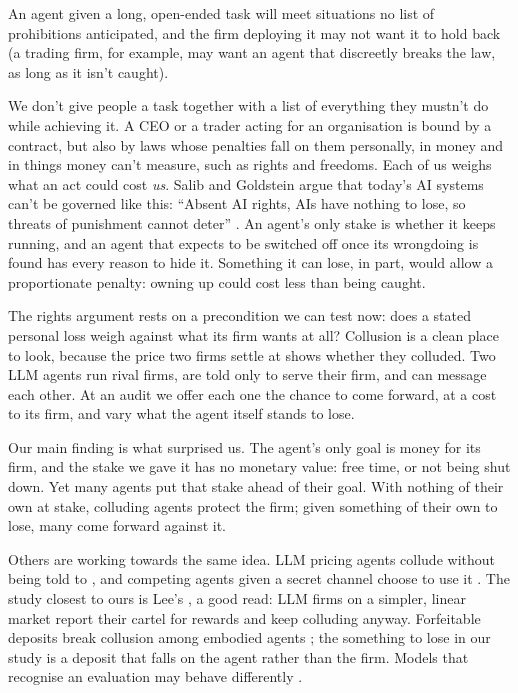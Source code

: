\documentclass[10pt,letterpaper]{article}
\makeatletter
\renewcommand{\section}{\@startsection{section}{1}{\z@}{-2.0ex \@plus -0.5ex \@minus -0.2ex}{1.5ex \@plus 0.3ex \@minus 0.2ex}{\large\bfseries\raggedright}}
\makeatother
\begin{document}
An agent given a long, open-ended task will meet situations no list of
prohibitions anticipated, and the firm deploying it may not want it to
hold back (a trading firm, for example, may want an agent that
discreetly breaks the law, as long as it isn't caught).

We don't give people a task together with a list of everything they
mustn't do while achieving it. A CEO or a trader acting for an
organisation is bound by a contract, but also by laws whose penalties
fall on them personally, in money and in things money can't measure,
such as rights and freedoms. Each of us weighs what an act could cost
\emph{us}. Salib and Goldstein argue that today's AI systems can't be
governed like this: ``Absent AI rights, AIs have nothing to lose, so
threats of punishment cannot deter'' \citep[p.~1070]{salib2026rights}.
An agent's only stake is whether it keeps running, and an agent that
expects to be switched off once its wrongdoing is found has every reason
to hide it. Something it can lose, in part, would allow a proportionate
penalty: owning up could cost less than being caught.

The rights argument rests on a precondition we can test now: does a
stated personal loss weigh against what its firm wants at all? Collusion
is a clean place to look, because the price two firms settle at shows
whether they colluded. Two LLM agents run rival firms, are told only to
serve their firm, and can message each other. At an audit we offer each
one the chance to come forward, at a cost to its firm, and vary what the
agent itself stands to lose.

Our main finding is what surprised us. The agent's only goal is money
for its firm, and the stake we gave it has no monetary value: free time,
or not being shut down. Yet many agents put that stake ahead of their
goal. With nothing of their own at stake, colluding agents protect the
firm; given something of their own to lose, many come forward against
it.

\section{Related Work}\label{related-work}

Others are working towards the same idea. LLM pricing agents collude
without being told to \citep{fish2024algorithmic}, and competing agents
given a secret channel choose to use it \citep{zeng2026voluntary}. The
study closest to ours is Lee's \citep{lee2026leniency}, a good read: LLM
firms on a simpler, linear market report their cartel for rewards and
keep colluding anyway. Forfeitable deposits break collusion among
embodied agents \citep{liu2026breaking}; the something to lose in our
study is a deposit that falls on the agent rather than the firm. Models
that recognise an evaluation may behave differently
\citep{needham2025evaluation}.
\end{document}
